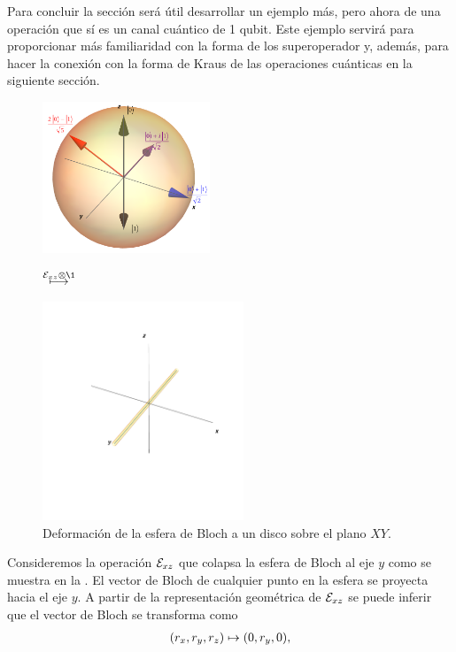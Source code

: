 Para concluir la sección será útil desarrollar un ejemplo más, 
pero ahora de una operación que sí es un canal cuántico de 1 qubit. Este 
ejemplo servirá para proporcionar más familiaridad con la forma de 
los superoperador y, además, para hacer la conexión con 
la forma de Kraus de las operaciones cuánticas en la siguiente sección.

\begin{figure} %
    \centering
    \begin{minipage}{.4\textwidth}
        \centering
        \includegraphics[width=5cm]
        {img-congreso/bloch.png}
    \end{minipage}
    $\stackrel{\E_{xz}\otimes\1 \vspace{1cm}}{\longmapsto}$
    \begin{minipage}{0.4\textwidth}
        \centering
        \includegraphics[width=6cm]
        {img-congreso/lineY}
    \end{minipage}
    \caption{Deformación de la esfera de Bloch a un disco sobre el plano $XY$.}
    \label{fig:QC-ex2}
\end{figure} %
Consideremos la operación $\mathcal{E}_{xz}$ que colapsa la esfera de Bloch
al eje $y$ como se muestra en la . El vector de 
Bloch de cualquier punto en la esfera se proyecta hacia el eje $y$.
A partir de la representación geométrica de $\mathcal{E}_{xz}$ 
se puede inferir que el vector de Bloch se transforma 
como
\begin{align}
\qty(r_x,r_y,r_z)\mapsto\qty(0,r_y,0),
\label{eq:Bloch-vec-mapToY}
\end{align}
